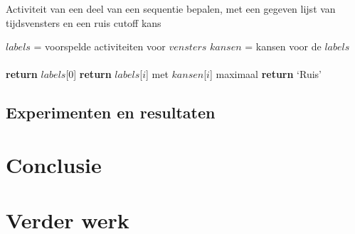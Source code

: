 \documentclass{article}
\begin{document}
\begin{algorithm}
  \caption{Activiteit van een deel van een sequentie bepalen, met een gegeven lijst van tijdsvensters en een ruis cutoff kans}
  \label{alg:deel}
  \begin{algorithmic}[0]
      \State $labels$ = voorspelde activiteiten voor $vensters$ 
      \State $kansen$ = kansen voor de $labels$ \\
       \\
        \State \textbf{return} $labels$[$0$]
      \Else
          \State \textbf{return} $labels$[$i$] met $kansen$[$i$] maximaal
        \Else
          \State \textbf{return} `Ruis'
        \EndIf
      \EndIf
    \EndProcedure
  \end{algorithmic}
\end{algorithm}


\subsection{Experimenten en resultaten}
\label{sequenties:experimenten}


\section{Conclusie}


\section{Verder werk}








\end{document}
